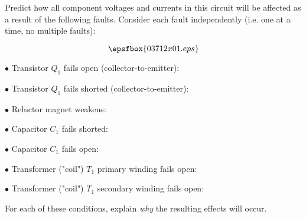 

Predict how all component voltages and currents in this circuit will be affected as a result of the following faults.  Consider each fault independently (i.e. one at a time, no multiple faults):

$$\epsfbox{03712x01.eps}$$

\medskip
\item{$\bullet$} Transistor $Q_1$ fails open (collector-to-emitter):
\vskip 5pt
\item{$\bullet$} Transistor $Q_1$ fails shorted (collector-to-emitter):
\vskip 5pt
\item{$\bullet$} Reluctor magnet weakens:
\vskip 5pt
\item{$\bullet$} Capacitor $C_1$ fails shorted:
\vskip 5pt
\item{$\bullet$} Capacitor $C_1$ fails open:
\vskip 5pt
\item{$\bullet$} Transformer ("coil") $T_1$ primary winding fails open:
\vskip 5pt
\item{$\bullet$} Transformer ("coil") $T_1$ secondary winding fails open:
\medskip

For each of these conditions, explain {\it why} the resulting effects will occur.







